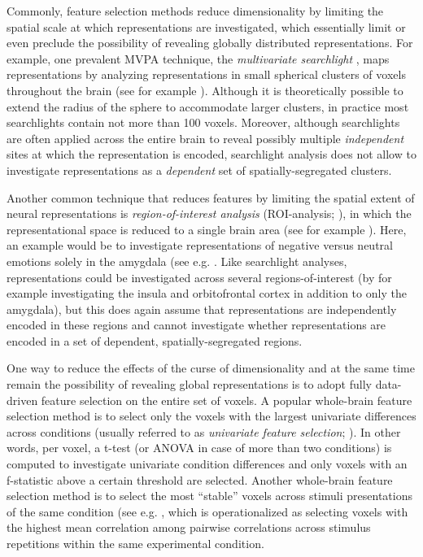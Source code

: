 \documentclass[jou,12pt,a4paper]{apa6}
\begin{document}
Commonly, feature selection methods reduce dimensionality by limiting the spatial scale at which representations are investigated, which essentially limit or even preclude the possibility of revealing globally distributed representations. For example, one prevalent MVPA technique, the \emph{multivariate searchlight} \cite{kriegeskorte2006}, maps representations by analyzing representations in small spherical clusters of voxels throughout the brain (see for example ). Although it is theoretically possible to extend the radius of the sphere to accommodate larger clusters, in practice most searchlights contain not more than 100 voxels. Moreover, although searchlights are often applied across the entire brain to reveal possibly multiple \emph{independent} sites at which the representation is encoded, searchlight analysis does not allow to investigate representations as a \emph{dependent} set of spatially-segregated clusters. 

Another common technique that reduces features by limiting the spatial extent of neural representations is \emph{region-of-interest analysis} (ROI-analysis; ), in which the representational space is reduced to a single brain area (see for example ). Here, an example would be to investigate representations of negative versus neutral emotions solely in the amygdala (see e.g. . Like searchlight analyses, representations could be investigated across several regions-of-interest (by for example investigating the insula and orbitofrontal cortex in addition to only the amygdala), but this does again assume that representations are independently encoded in these regions and cannot investigate whether representations are encoded in a set of dependent, spatially-segregated regions.

One way to reduce the effects of the curse of dimensionality and at the same time remain the possibility of revealing global representations is to adopt fully data-driven feature selection on the entire set of voxels. A popular whole-brain feature selection method is to select only the voxels with the largest univariate differences across conditions (usually referred to as \emph{univariate feature selection}; ). In other words, per voxel, a t-test (or ANOVA in case of more than two conditions) is computed to investigate univariate condition differences and only voxels with an f-statistic above a certain threshold are selected. Another whole-brain feature selection method is to select the most ``stable'' voxels across stimuli presentations of the same condition (see e.g. , which is operationalized as selecting voxels with the highest mean correlation among pairwise correlations across stimulus repetitions within the same experimental condition.          
\end{document}
